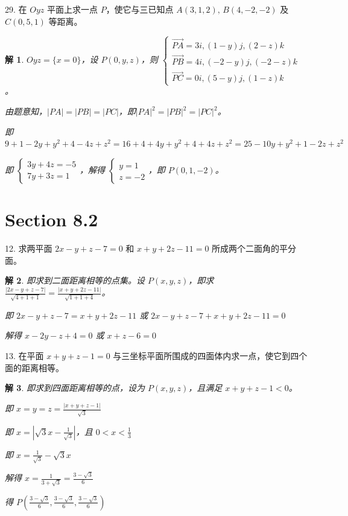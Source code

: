 \documentclass[a4paper,12pt]{article}
\newtheorem*{解}{解}
\begin{document}
29. 在 $Oyz$ 平面上求一点 $P$，使它与三已知点 $A(3, 1, 2),\,B(4, -2, -2)$ 及 $C(0, 5, 1)$ 等距离。

\begin{解}
$Oyz=\{x=0\}$，设 $P(0,y,z)$，则 $\begin{cases}
        \overrightarrow{PA}=3i,(1-y)j,(2-z)k   \\
        \overrightarrow{PB}=4i,(-2-y)j,(-2-z)k \\
        \overrightarrow{PC}=0i,(5-y)j,(1-z)k
    \end{cases}$。

由题意知，$|PA|=|PB|=|PC|$，即$|PA|^2=|PB|^2=|PC|^2$。

即 $9+1-2y+y^2+4-4z+z^2=16+4+4y+y^2+4+4z+z^2=25-10y+y^2+1-2z+z^2$

即 $\begin{cases}
        3y+4z=-5 \\
        7y+3z=1
    \end{cases}$，解得 $\begin{cases}
        y=1 \\
        z=-2
    \end{cases}$，即 $P(0,1,-2)$。
\end{解}

\section*{Section 8.2}

12. 求两平面 $2x - y + z - 7 = 0$ 和 $x + y + 2z - 11 = 0$ 所成两个二面角的平分面。

\begin{解}
即求到二面距离相等的点集。设 $P(x,y,z)$，即求 $\frac{|2x-y+z-7|}{\sqrt{4+1+1}}=\frac{|x+y+2z-11|}{\sqrt{1+1+4}}$。

即 $2x-y+z-7=x+y+2z-11$ 或 $2x-y+z-7+x+y+2z-11=0$

解得 $x-2y-z+4=0$ 或 $x+z-6=0$
\end{解}

13. 在平面 $x + y + z - 1 = 0$ 与三坐标平面所围成的四面体内求一点，使它到四个面的距离相等。

\begin{解}
即求到四面距离相等的点，设为 $P(x,y,z)$，且满足 $x + y + z - 1 < 0$。

即 $x=y=z=\frac{|x+y+z-1|}{\sqrt{3}}$

即 $x=\left|\sqrt{3}x-\frac{1}{\sqrt{3}}\right|$，且 $0<x<\frac{1}{3}$

即 $x=\frac{1}{\sqrt{3}}-\sqrt{3}x$

解得 $x=\frac{1}{3+\sqrt{3}}=\frac{3-\sqrt{3}}{6}$

得 $P\left(\frac{3-\sqrt{3}}{6},\frac{3-\sqrt{3}}{6},\frac{3-\sqrt{3}}{6}\right)$
\end{解}
\end{document}

